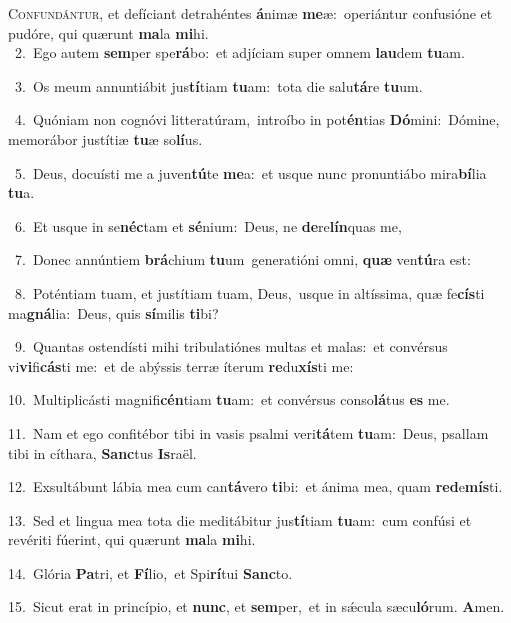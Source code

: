 \lettrine{\initial\textcolor{\initialcolor}{C}}{onfundántur,} et defíciant detrahéntes \textbf{á}\-nimæ \textbf{me}\-æ:~\star operiántur confusióne et pudóre, qui quærunt \textbf{ma}\-la \textbf{mi}\-hi.\\
{\numbfont\textcolor{\numbcolor}{~2.}}~Ego autem \textbf{sem}\-per spe\-\textbf{rá}\-bo:~\star et adjíciam super omnem \textbf{lau}\-dem \textbf{tu}\-am.\par
{\numbfont\textcolor{\numbcolor}{~3.}}~Os meum annuntiábit jus\-\textbf{tí}\-tiam \textbf{tu}\-am:~\star tota die salu\-\textbf{tá}\-re \textbf{tu}\-um.\par
{\numbfont\textcolor{\numbcolor}{~4.}}~Quóniam non cognóvi litteratúram,~\dagger introíbo in pot\-\textbf{én}\-tias \textbf{Dó}\-mini:~\star Dómine, memorábor justítiæ \textbf{tu}\-æ so\-\textbf{lí}\-us.\par
{\numbfont\textcolor{\numbcolor}{~5.}}~Deus, docuísti me a juven\-\textbf{tú}\-te \textbf{me}\-a:~\star et usque nunc pronuntiábo mira\-\textbf{bí}\-lia \textbf{tu}\-a.\par
{\numbfont\textcolor{\numbcolor}{~6.}}~Et usque in se\-\textbf{néc}\-tam et \textbf{sé}\-nium:~\star Deus, ne \textbf{de}\-re\-\textbf{lín}\-quas me,\par
{\numbfont\textcolor{\numbcolor}{~7.}}~Donec annúntiem \textbf{brá}\-chium \textbf{tu}\-um~\star generatióni omni, \textbf{quæ} ven\-\textbf{tú}\-ra est:\par
{\numbfont\textcolor{\numbcolor}{~8.}}~Poténtiam tuam, et justítiam tuam, Deus,~\dagger usque in altíssima, quæ fe\-\textbf{cís}\-ti ma\-\textbf{gná}\-lia:~\star Deus, quis \textbf{sí}\-milis \textbf{ti}\-bi?\par
{\numbfont\textcolor{\numbcolor}{~9.}}~Quantas ostendísti mihi tribulatiónes multas et malas:~\dagger et convérsus vi\-\textbf{vi}\-fi\-\textbf{cás}\-ti me:~\star et de abýssis terræ íterum \textbf{re}\-du\-\textbf{xís}\-ti me:\par
{\numbfont\textcolor{\numbcolor}{10.}}~Multiplicásti magnifi\-\textbf{cén}\-tiam \textbf{tu}\-am:~\star et convérsus conso\-\textbf{lá}\-tus \textbf{es} me.\par
{\numbfont\textcolor{\numbcolor}{11.}}~Nam et ego confitébor tibi in vasis psalmi veri\-\textbf{tá}\-tem \textbf{tu}\-am:~\star Deus, psallam tibi in cíthara, \textbf{Sanc}\-tus \textbf{Is}\-raël.\par
{\numbfont\textcolor{\numbcolor}{12.}}~Exsultábunt lábia mea cum can\-\textbf{tá}\-vero \textbf{ti}\-bi:~\star et ánima mea, quam \textbf{red}\-e\-\textbf{mís}\-ti.\par
{\numbfont\textcolor{\numbcolor}{13.}}~Sed et lingua mea tota die meditábitur jus\-\textbf{tí}\-tiam \textbf{tu}\-am:~\star cum confúsi et revériti fúerint, qui quærunt \textbf{ma}\-la \textbf{mi}\-hi.\par
{\numbfont\textcolor{\numbcolor}{14.}}~Glória \textbf{Pa}\-tri, et \textbf{Fí}\-lio,~\star et Spi\-\textbf{rí}\-tui \textbf{Sanc}\-to.\par
{\numbfont\textcolor{\numbcolor}{15.}}~Sicut erat in princípio, et \textbf{nunc}\-, et \textbf{sem}\-per,~\star et in sǽcula sæcu\-\textbf{ló}\-rum. \textbf{A}\-men.\par
